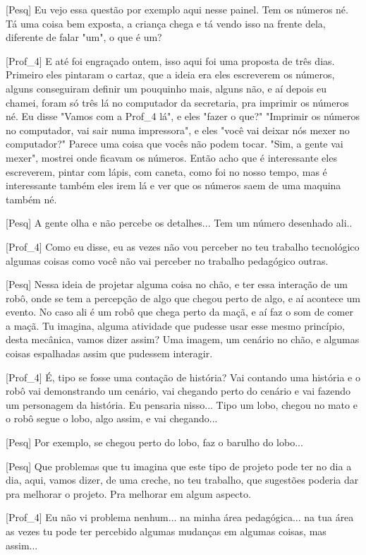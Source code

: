 [Pesq] Eu vejo essa questão por exemplo aqui nesse painel. Tem os números né. Tá uma coisa bem exposta, a criança chega e tá vendo isso na frente dela, diferente de falar "um", o que é um? 

[Prof\_4] E até foi engraçado ontem, isso aqui foi uma proposta de três dias. Primeiro eles pintaram o cartaz, que a ideia era eles escreverem os números, alguns conseguiram definir um pouquinho mais, alguns não, e aí depois eu chamei, foram só três lá no computador da secretaria, pra imprimir os números né. Eu disse "Vamos com a Prof\_4 lá", e eles "fazer o que?" "Imprimir os números no computador, vai sair numa impressora", e eles "você vai deixar nós mexer no computador?" Parece uma coisa que vocês não podem tocar. "Sim, a gente vai mexer", mostrei onde ficavam os números. Então acho que é interessante eles escreverem, pintar com lápis, com caneta, como foi no nosso tempo, mas é interessante também eles irem lá e ver que os números saem de uma maquina também né.

[Pesq] A gente olha e não percebe os detalhes... Tem um número desenhado ali.. 

[Prof\_4] Como eu disse, eu as vezes não vou perceber no teu trabalho tecnológico algumas coisas como você não vai perceber no trabalho pedagógico outras. 

[Pesq] Nessa ideia de projetar alguma coisa no chão, e ter essa interação de um robô, onde se tem a percepção de algo que chegou perto de algo, e aí acontece um evento. No caso ali é um robô que chega perto da maçã, e aí faz o som de comer a maçã. Tu imagina, alguma atividade que pudesse usar esse mesmo princípio, desta mecânica, vamos dizer assim? Uma imagem, um cenário no chão, e algumas coisas espalhadas assim que pudessem interagir.

[Prof\_4] É, tipo se fosse uma contação de história? Vai contando uma história e o robô vai demonstrando um cenário, vai chegando perto do cenário e vai fazendo um personagem da história. Eu pensaria nisso... Tipo um lobo, chegou no mato e o robô segue o lobo, algo assim, e vai chegando...

[Pesq] Por exemplo, se chegou perto do lobo, faz o barulho do lobo... 

[Pesq] Que problemas que tu imagina que este tipo de projeto pode ter no dia a dia, aqui, vamos dizer, de uma creche, no teu trabalho, que sugestões poderia dar pra melhorar o projeto. Pra melhorar em algum aspecto. 

[Prof\_4] Eu não vi problema nenhum... na minha área pedagógica... na tua área as vezes tu pode ter percebido algumas mudanças em algumas coisas, mas assim... 

